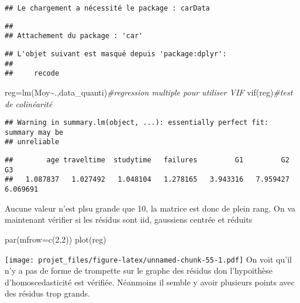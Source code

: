 \documentclass[
]{article}
\newenvironment{Shaded}{\begin{snugshade}}{\end{snugshade}}
\newcommand{\AttributeTok}[1]{\textcolor[rgb]{0.77,0.63,0.00}{#1}}
\newcommand{\CommentTok}[1]{\textcolor[rgb]{0.56,0.35,0.01}{\textit{#1}}}
\newcommand{\DecValTok}[1]{\textcolor[rgb]{0.00,0.00,0.81}{#1}}
\newcommand{\FunctionTok}[1]{\textcolor[rgb]{0.00,0.00,0.00}{#1}}
\newcommand{\NormalTok}[1]{#1}
\newcommand{\OtherTok}[1]{\textcolor[rgb]{0.56,0.35,0.01}{#1}}
\newcommand{\SpecialCharTok}[1]{\textcolor[rgb]{0.00,0.00,0.00}{#1}}
\begin{document}
\begin{verbatim}
## Le chargement a nécessité le package : carData
\end{verbatim}

\begin{verbatim}
## 
## Attachement du package : 'car'
\end{verbatim}

\begin{verbatim}
## L'objet suivant est masqué depuis 'package:dplyr':
## 
##     recode
\end{verbatim}

\begin{Shaded}
\begin{Highlighting}[]
\NormalTok{reg}\OtherTok{=}\FunctionTok{lm}\NormalTok{(Moy}\SpecialCharTok{\textasciitilde{}}\NormalTok{.,data\_quanti)}\CommentTok{\#regression multiple pour utiliser VIF }
\FunctionTok{vif}\NormalTok{(reg)}\CommentTok{\#test de colinéarité }
\end{Highlighting}
\end{Shaded}

\begin{verbatim}
## Warning in summary.lm(object, ...): essentially perfect fit: summary may be
## unreliable
\end{verbatim}

\begin{verbatim}
##        age traveltime  studytime   failures         G1         G2         G3 
##   1.087837   1.027492   1.048104   1.278165   3.943316   7.959427   6.069691
\end{verbatim}

Aucune valeur n'est plsu grande que 10, la matrice est donc de plein
rang. On va maintenant vérifier si les résidus sont iid, gaussiens
centrée et réduits

\begin{Shaded}
\begin{Highlighting}[]
\FunctionTok{par}\NormalTok{(}\AttributeTok{mfrow=}\FunctionTok{c}\NormalTok{(}\DecValTok{2}\NormalTok{,}\DecValTok{2}\NormalTok{))}
\FunctionTok{plot}\NormalTok{(reg)}
\end{Highlighting}
\end{Shaded}

\texttt{[image: projet\_files/figure-latex/unnamed-chunk-55-1.pdf]} On
voit qu'il n'y a pas de forme de trompette sur le graphe des résidus don
l'hypoithèse d'homoscedasticité est vérifiée. Néanmoins il semble y
avoir plusieurs points avec des résidus trop grands.
\end{document}
